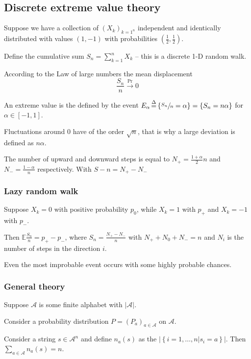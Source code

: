 \documentclass[a4paper]{article}
\newcommand{\obj}[1]{{\left\{ #1 \right \}}}
\newcommand{\clo}[1]{{\left [ #1 \right ]}}
\newcommand{\brac}[1]{{\left ( #1 \right )}}
\newcommand{\induc}[1]{{\left . #1 \right \vert}}
\newcommand{\abs}[1]{{\left | #1 \right |}}
\newcommand{\Acal}{\mathcal{A}}
\newcommand{\Ex}{\mathbb{E}}
\newcommand{\defn}{\mathop{\overset{\Delta}{=}}\nolimits}
\begin{document}
\subsection{Discrete extreme value theory} %
\label{sub:discrete_extreme_value_theory}
Suppose we have a collection of $\brac{X_k}_{k=1^n}$ independent and identically distributed with values $\brac{1, -1}$ with probabilities $\brac{\frac{1}{2},\frac{1}{2}}$.

Define the cumulative sum $S_n = \sum_{k=1}^n X_k$ -- this is a discrete 1-D random walk.

According to the Law of large numbers the mean displacement 
\[\frac{S_n}{n} \overset{\Pr}{\to} 0\]

An extreme value is the defined by the event $E_\alpha \defn \obj{ \sfrac{S_n}{n} = \alpha } = \obj{ S_n = n\alpha }$ for $\alpha\in \clo{-1,1}$.

Fluctuations around $0$ have of the order $\sqrt{n}$, that is why a large deviation is defined as $n\alpha$.

The number of upward and downward steps is equal to $N_+ = \frac{1+\alpha}{2}n$ and $N_- = \frac{1-\alpha}{n}$ respectively. With $S-n = N_+-N_-$

\subsubsection{Lazy random walk} %
\label{ssub:lazy_random_walk}

Suppose $X_k = 0$ with positive probability $p_0$, while $X_k = 1$ with $p_+$ and $X_k=-1$ with $p_-$. 

Then $\Ex \frac{S_n}{n} = p_+ - p_-$, where $S_n = \frac{N_+-N_-}{n}$ with $N_++N_0+N_- = n$ and $N_i$ is the number of steps in the direction $i$.

Even the most improbable event occurs with some highly probable chances.


\subsubsection{General theory} %
\label{ssub:general_theory}

Suppose $\Acal$ is some finite alphabet with $\abs{\Acal}$.

Consider a probability distribution $P = \brac{P_a}_{a\in \Acal}$ on $\Acal$.

Consider a string $s\in \Acal^n$ and define $n_a(s)$  as the $\abs{\obj{\induc{i=1,\ldots,n} s_i = a }}$. Then $\sum_{a\in\Acal} n_a(s) = n$.
\end{document}

